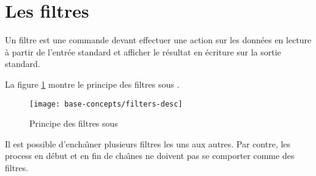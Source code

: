 \section{\label{bcpts-filters}Les filtres}

Un filtre est une commande {\Unix} devant effectuer une action sur
les donn{\'e}es en lecture {\`a} partir de l'entr{\'e}e standard et afficher le
r{\'e}sultat en {\'e}criture sur la sortie standard.

La figure \ref{fig-bcpts-filters-desc} montre le principe des filtres sous
{\Unix}.

\begin{figure}[hbtp]
\centering
\texttt{[image: base-concepts/filters-desc]}
\caption{\label{fig-bcpts-filters-desc}Principe des filtres sous {\Unix}}
\end{figure}

Il est possible d'encha{\^\i}ner plusieurs filtres les uns aux autres. Par contre, les process en d{\'e}but et en fin de cha{\^\i}nes ne doivent pas se comporter comme des filtres.

